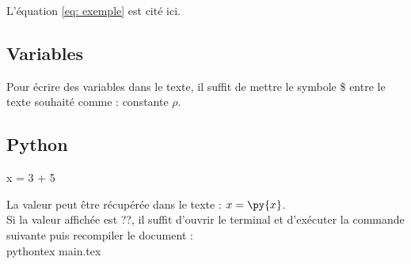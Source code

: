 \documentclass[a4paper,12pt]{article} %
\begin{document}
L'équation \ref{eq: exemple} est cité ici. 

\subsection{Variables}

Pour écrire des variables dans le texte, il suffit de mettre le symbole \$ entre le texte souhaité comme : constante $\rho$.

\subsection{Python}

\begin{pycode}
x = 3 + 5
\end{pycode}
       
La valeur peut être récupérée dans le texte : $x = \py{x}$.\\
Si la valeur affichée est ??, il suffit d'ouvrir le terminal et d'exécuter la 
commande suivante puis recompiler le document :\\
pythontex main.tex     
\end{document}
